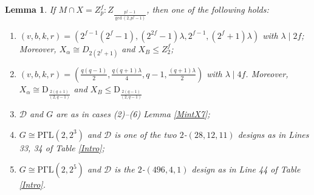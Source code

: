 \documentclass[a4paper,twopage,reqno,12pt]{amsart}
\newtheorem{lemma}[theorem]{Lemma}
\theoremstyle{definition}
\numberwithin{equation}{section}
\newcommand{\PGaL}{\mathrm{P\Gamma L}}
\newcommand{\D}{\mathrm{D}}
\renewcommand{\leq}{\leqslant}
\begin{document}
\begin{lemma}\label{MintX9} If $M\cap X=Z_{p}^{f}:Z_{\frac{p^{f}-1}{\gcd(2,p^{f}-1)}}$, then one of the following holds:
\begin{enumerate}
   \item  $\left(v,b,k,r\right)=\left(2^{f-1}(2^{f}-1),(2^{2f}-1)\lambda,2^{f-1},(2^{f}+1)\lambda\right)$ with $\lambda \mid 2f$; Moreover, $X_{\alpha}\cong D_{2(2^f+1)}$ and $X_{B}\leq Z^{f}_{2}$; 
    \item $\left(v,b,k,r\right)=\left(\frac{q(q-1)}{2},\frac{q(q+1)\lambda}{4},q-1,\frac{(q+1)\lambda}{2}\right)$ with $\lambda \mid 4f$. Moreover, $X_{\alpha}\cong \D_{\frac{2(q+1)}{(2,q-1)}}$ and $X_{B}\leq \D_{\frac{2(q-1)}{(2,q-1)}}$
    \item $\mathcal{D}$ and $G$ are as in cases (2)--(6) Lemma \ref{MintX7};
        \item $G\cong \PGaL(2,2^{3})$ and $\mathcal{D}$ is one of the two $2$-$(28,12,11)$ designs as in Lines 33, 34 of Table \ref{Intro};
       \item $G\cong \PGaL(2,2^5)$ and $\mathcal{D}$ is the $2$-$(496,4,1)$ design as in Line 44 of Table \ref{Intro}.
       
\end{enumerate}    
\end{lemma}
\end{document}
